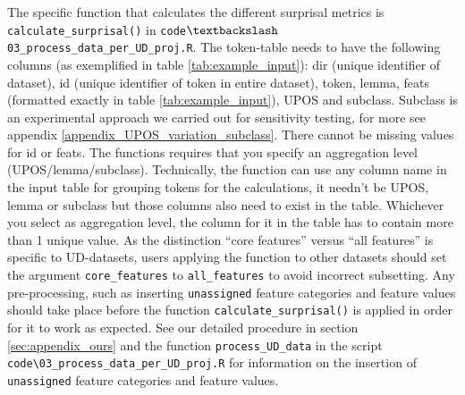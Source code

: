 \documentclass[USenglish]{article}
\begin{document}
The specific function that calculates the different surprisal metrics is \texttt{calculate\_surprisal()} in \texttt{code$\textbackslash${}03\_process\_data\_per\_UD\_proj.R}. The token-table needs to have the following columns (as exemplified in table \ref{tab:example_input}): dir (unique identifier of dataset), id (unique identifier of token in entire dataset), token, lemma, feats (formatted exactly in table \ref{tab:example_input}), UPOS and subclass.
Subclass is an experimental approach we carried out for sensitivity testing, for more see appendix \ref{appendix_UPOS_variation_subclass}.
There cannot be missing values for id or feats. 
The functions requires that you specify an aggregation level (UPOS/lemma/subclass). 
Technically, the function can use any column name in the input table for grouping tokens for the calculations, it needn't be UPOS, lemma or subclass but those columns also need to exist in the table.
Whichever you select as aggregation level, the column for it in the table has to contain more than 1 unique value.
As the distinction ``core features'' versus ``all features'' is specific to UD-datasets, users applying the function to other datasets should set the argument \texttt{core\_features} to \texttt{all\_features} to avoid incorrect subsetting.
Any pre-processing, such as inserting \texttt{unassigned} feature categories and feature values should take place before the function \texttt{calculate\_surprisal()} is applied in order for it to work as expected. 
See our detailed procedure in section \ref{sec:appendix_ours} and the function \texttt{process\_UD\_data} in the script \texttt{code\textbackslash{}03\_process\_data\_per\_UD\_proj.R} for information on the insertion of \texttt{unassigned} feature categories and feature values.
\end{document}
